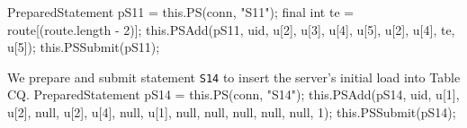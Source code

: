 \documentclass{article}
\def\nwendcode{\endtrivlist \endgroup}      %
\let\nwdocspar=\par
\theoremstyle{definition}                   %
\begin{document}
PreparedStatement pS11 = this.PS(conn, "S11");
final int te = route[(route.length - 2)];
this.PSAdd(pS11, uid, u[2], u[3], u[4], u[5], u[2], u[4], te, u[5]);
this.PSSubmit(pS11);
\nwendcode{}\nwdocspar
{\small We prepare and submit statement {\tt{}\protect{}S14} to insert the server's
initial load into Table CQ.}
\nwenddocs{}\endmoddef{}
PreparedStatement pS14 = this.PS(conn, "S14");
this.PSAdd(pS14, uid, u[1], u[2], null, u[2], u[4], null, u[1],
    null, null, null, null, null, 1);
this.PSSubmit(pS14);
\nwendcode{}\nwdocspar
\end{document}

